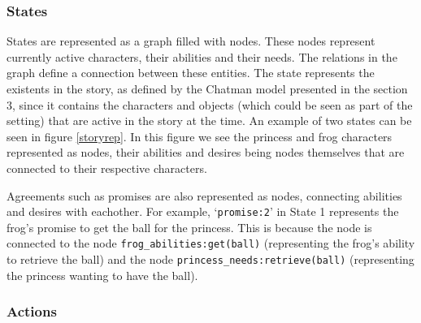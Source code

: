 \subsubsection{States}

States are represented as a graph filled with nodes. These nodes represent currently
active characters, their abilities and their needs. The relations in the graph define a
connection between these entities. The state represents the existents in the
story, as defined by the Chatman model presented in the section 3, since
it contains the characters and objects (which could be seen as part of the
setting) that are active in the story at the time.
An example of two states can be seen in figure \ref{storyrep}.
In this figure we see the princess and frog characters represented as nodes,
their abilities and desires being nodes themselves that are connected to their
respective characters. 

Agreements such as promises are also represented as
nodes, connecting abilities and desires with eachother. For example,
`\texttt{promise:2}' in State 1 represents the frog's promise to get the ball for the
princess. This is because the node is connected to the node
\texttt{frog\_abilities:get(ball)} (representing the frog's ability to retrieve the
ball) and the node \texttt{princess\_needs:retrieve(ball)} (representing the princess
wanting to have the ball).

\subsubsection{Actions}

